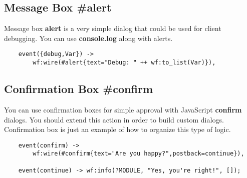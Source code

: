 \subsection{Message Box {\bf \#alert}}
Message box {\bf alert} is a very simple dialog that could be used for client debugging.
You can use {\bf console.log} along with alerts.

\vspace{1\baselineskip}
\begin{lstlisting}
    event({debug,Var}) ->
        wf:wire(#alert{text="Debug: " ++ wf:to_list(Var)}),
\end{lstlisting}

\subsection{Confirmation Box {\bf \#confirm}}
You can use confirmation boxes for simple approval with JavaScript {\bf confirm} dialogs.
You should extend this action in order to build custom dialogs. Confirmation box is just an example of how to
organize this type of logic.

\vspace{1\baselineskip}
\begin{lstlisting}
    event(confirm) ->
        wf:wire(#confirm{text="Are you happy?",postback=continue}),

    event(continue) -> wf:info(?MODULE, "Yes, you're right!", []);
\end{lstlisting}
\vspace{1\baselineskip}
